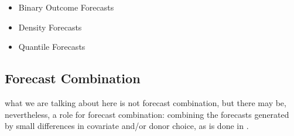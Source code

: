 \documentclass[11pt]{article}
\theoremstyle{definition}
\begin{document}
\begin{itemize}
  \item Binary Outcome Forecasts
  \item Density Forecasts
  \item Quantile Forecasts
\end{itemize}

\subsection{Forecast Combination}
what we are talking about here is not forecast combination, but there may be, nevertheless, a role for forecast combination: combining the forecasts generated by small differences in covariate and/or donor choice, as is done in \cite{lundquist2024volatility}. \\

\clearpage



 
\end{document}
